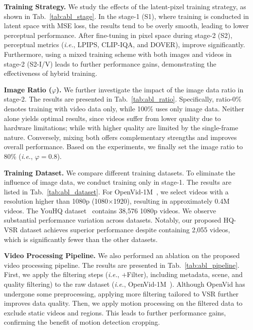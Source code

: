 \documentclass{article}
\newcommand\ie{\textit{i.e.}}
\begin{document}
\noindent \textbf{Training Strategy.}
We study the effects of the latent-pixel training strategy, as shown in Tab.~\ref{tab:abl_stage}. In the stage-1 (S1), where training is conducted in latent space with MSE loss, the results tend to be overly smooth, leading to lower perceptual performance. After fine-tuning in pixel space during stage-2 (S2), perceptual metrics (\ie, LPIPS, CLIP-IQA, and DOVER), improve significantly. Furthermore, using a mixed training scheme with both images and videos in stage-2 (S2-I/V) leads to further performance gains, demonstrating the effectiveness of hybrid training.

\noindent \textbf{Image Ratio ($\varphi$).}
We further investigate the impact of the image data ratio in stage-2. The results are presented in Tab.~\ref{tab:abl_ratio}. Specifically, ratio-0\% denotes training with video data only, while 100\% uses only image data.
Neither alone yields optimal results, since videos suffer from lower quality due to hardware limitations; while with higher quality are limited by the single-frame nature. Conversely, mixing both offers complementary strengths and improves overall performance. Based on the experiments, we finally set the image ratio to 80\% (\ie, $\varphi$$=$0.8).

\vspace{-1.mm}
\noindent \textbf{Training Dataset.}
We compare different training datasets. To eliminate the influence of image data, we conduct training only in stage-1. The results are listed in Tab.~\ref{tab:abl_dataset}. For OpenVid-1M~\cite{nan2024openvid}, we select videos with a resolution higher than 1080p (1080$\times$1920), resulting in approximately 0.4M videos. The YouHQ dataset~\cite{zhou2024upscale} contains 38,576 1080p videos. We observe substantial performance variation across datasets. Notably, our proposed HQ-VSR dataset achieves superior performance despite containing 2,055 videos, which is significantly fewer than the other datasets. 

\vspace{-1.mm}
\noindent \textbf{Video Processing Pipeline.}
We also performed an ablation on the proposed video processing pipeline. The results are presented in Tab.~\ref{tab:abl_pipeline}. First, we apply the filtering steps (\ie, $+$Filter), including metadata, scene, and quality filtering) to the raw dataset (\ie, OpenVid-1M~\cite{nan2024openvid}). Although OpenVid has undergone some preprocessing, applying more filtering tailored to VSR further improves data quality.
Then, we apply motion processing on the filtered data to exclude static videos and regions. This leads to further performance gains, confirming the benefit of motion detection cropping.
\end{document}
